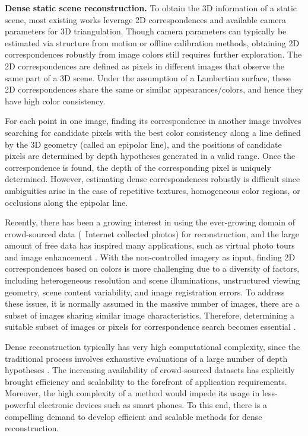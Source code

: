 \textbf{Dense static scene reconstruction.}
To obtain the 3D information of a static scene, most existing works leverage 2D correspondences and available camera parameters for 3D triangulation. Though camera parameters can typically be estimated via structure from motion or offline calibration methods, obtaining 2D correspondences robustly from image colors still requires further exploration. The 2D correspondences are defined as pixels in different images that observe the same part of a 3D scene. Under the assumption of a Lambertian surface, these 2D correspondences share the same or similar appearances/colors, and hence they have high color consistency.

For each point in one image, finding its correspondence in another image involves searching for candidate pixels with the best color consistency along a line defined by the 3D geometry (called an epipolar line), and the positions of candidate pixels are determined by depth hypotheses generated in a valid range. Once the correspondence is found, the depth of the corresponding pixel is uniquely determined. However, estimating dense correspondences robustly is difficult since ambiguities arise in the case of repetitive textures, homogeneous color regions, or occlusions along the epipolar line. 

Recently, there has been a growing interest in using the ever-growing domain of crowd-sourced data (\ie~Internet collected photos) for reconstruction, and the large amount of free data has inspired many applications, such as virtual photo tours \cite{Snavely2} and image enhancement \cite{zhang2014personal}. With the non-controlled imagery as input, finding 2D correspondences based on colors is more challenging due to a diversity of factors, including heterogeneous resolution and scene illuminations, unstructured viewing geometry, scene content variability, and image registration errors. To address these issues, it is normally assumed in the massive number of images, there are a subset of images sharing similar image characteristics. Therefore, determining a suitable subset of images or pixels for correspondence search becomes essential \cite{Goesele07}.

Dense reconstruction typically has very high computational complexity, since the traditional process involves exhaustive evaluations of a large number of depth hypotheses \cite{yang2003multi}. The increasing availability of crowd-sourced datasets has explicitly brought efficiency and scalability to the forefront of application requirements.  Moreover, the high complexity of a method would impede its usage in less-powerful electronic devices such as smart phones. To this end, there is a compelling demand to develop efficient and scalable methods for dense reconstruction.

